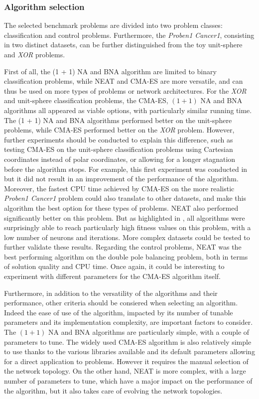 \subsubsection{Algorithm selection}

The selected benchmark problems are divided into two problem classes: classification and control problems. Furthermore, the \textit{Proben1 Cancer1}, consisting in two distinct datasets,
can be further distinguished from the toy unit-sphere and \textit{XOR} problems.

First of all, the (1 + 1) NA and BNA algorithm are limited to binary classification problems, while NEAT and CMA-ES are more versatile, and can thus be used on more types of problems or
network architectures. For the \textit{XOR} and unit-sphere classification problems, the CMA-ES, $(1 + 1)$ NA and BNA algorithms all appeared as viable options, with particularly similar running time.
The (1 + 1) NA and BNA algorithms performed better on the unit-sphere problems, while CMA-ES performed better on the \textit{XOR} problem.
However, further experiments should be conducted to explain this difference, such as testing CMA-ES on the unit-sphere classification problems using Cartesian coordinates instead of polar coordinates,
or allowing for a longer stagnation before the algorithm stops.
For example, this first experiment was conducted in \cite{na} but it did not result in an improvement of the performance of the algorithm.
Moreover, the fastest CPU time achieved by CMA-ES on the more realistic \textit{Proben1 Cancer1} problem could also translate to other datasets, and make this algorithm the best option for
these types of problems. NEAT also performed significantly better on this problem. But as highlighted in , all algorithms were surprisingly able to reach particularly high fitness
values on this problem, with a low number of neurons and iterations. More complex datasets could be tested to further validate these results.
Regarding the control problems, NEAT was the best performing algorithm on the double pole balancing problem, both in terms of solution quality and CPU time. Once again, it could be interesting to
experiment with different parameters for the CMA-ES algorithm itself.

Furthermore, in addition to the versatility of the algorithms and their performance, other criteria should be consiered when selecting an algorithm. Indeed the ease of use of the algorithm,
impacted by its number of tunable parameters and its implementation complexity, are important factors to consider. The $(1 + 1)$ NA and BNA algorithms are particularly simple, with a couple
of parameters to tune. The widely used CMA-ES algorithm is also relatively simple to use thanks to the various libraries available and its default parameters allowing for a direct
application to problems. However it requires the manual selection of the network topology. On the other hand, NEAT is more complex, with a large number of parameters to tune, which have a major
impact on the performance of the algorithm, but it also takes care of evolving the network topologies.

